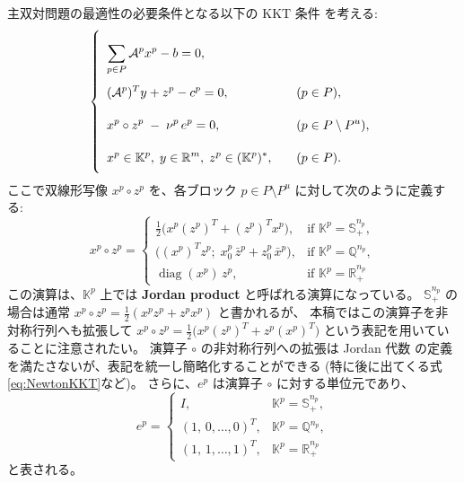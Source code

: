 \documentclass{jsarticle}
\begin{document}
\medskip

\noindent
主双対問題の最適性の必要条件となる以下の KKT 条件 を考える:
\begin{equation}
    \everymath{\displaystyle}
    \renewcommand{\arraystretch}{2.5}
    \left\{
    \begin{array}{ll}
        \sum_{p \in P} \mathcal{A}^p x^p - b = 0, & \\[-4pt]
        (\mathcal{A}^p)^T y + z^p - c^p = 0, & \quad (p \in P),\\[-4pt]
        x^p \circ z^p \;-\; \nu^p\,e^p = 0, & \quad (p \in P \setminus P^u),\\[-4pt]
        x^p \in \mathbb{K}^p,\; y \in \mathbb{R}^m,\; z^p \in (\mathbb{K}^p)^*, & \quad (p \in P).
    \end{array}
    \right.
    \label{eq:KKTcond}
\end{equation}
ここで双線形写像 $x^p \circ z^p$ を、各ブロック $p\in P \setminus P^u$ に対して次のように定義する:
\[
  x^p \circ z^p = 
  \begin{cases}
    \tfrac12 \bigl(x^p (z^p)^T + (z^p)^T x^p\bigr), 
      & \text{if } \mathbb{K}^p=\mathbb{S}^{n_p}_+,\\[4pt]
    \bigl((x^p)^T z^p;\; x^p_0\,\bar{z}^p + z^p_0\,\bar{x}^p\bigr),
      & \text{if } \mathbb{K}^p=\mathbb{Q}^{n_p},\\[4pt]
    \operatorname{diag}(x^p)\,z^p,
      & \text{if } \mathbb{K}^p=\mathbb{R}^{n_p}_+ %
  \end{cases}
\]
この演算は、$\mathbb{K}^p$ 上では \textbf{Jordan product} と呼ばれる演算になっている。
$\mathbb{S}^{n_p}_+$ の場合は通常 $x^p \circ z^p = \tfrac12(x^p z^p + z^p x^p)$ と書かれるが、
本稿ではこの演算子を非対称行列へも拡張して
$x^p \circ z^p = \tfrac12 \bigl(x^p (z^p)^T + z^p (x^p)^T\bigr)$
という表記を用いていることに注意されたい。
演算子 $\circ$ の非対称行列への拡張は Jordan 代数 \cite{Faraut1994} の定義を満たさないが、表記を統一し簡略化することができる
(特に後に出てくる式\eqref{eq:NewtonKKT}など)。 
さらに、$e^p$ は演算子 $\circ$ に対する単位元であり、
\[
  e^p = 
  \begin{cases}
    I, & \mathbb{K}^p=\mathbb{S}^{n_p}_+,\\[3pt]
    (1,\,0,\ldots,0)^T, & \mathbb{K}^p=\mathbb{Q}^{n_p},\\[3pt]
    (1,\,1,\ldots,1)^T, & \mathbb{K}^p=\mathbb{R}^{n_p}_+ %
  \end{cases}
\]
と表される。

\medskip
\end{document}
